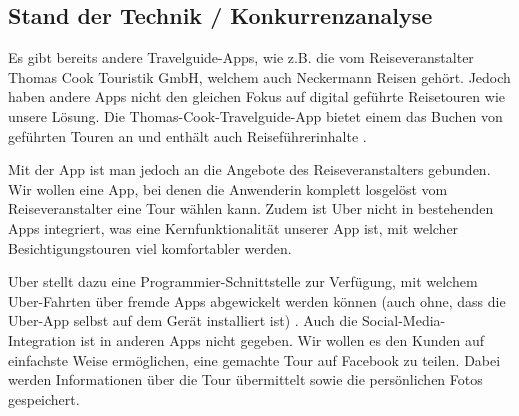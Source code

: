 \subsection{Stand der Technik / Konkurrenzanalyse}\label{StandTechnik}
Es gibt bereits andere Travelguide-Apps, wie z.B. die vom Reiseveranstalter Thomas Cook Touristik GmbH, welchem auch Neckermann Reisen gehört. Jedoch haben andere Apps nicht den gleichen Fokus auf digital geführte Reisetouren wie unsere Lösung. Die Thomas-Cook-Travelguide-App bietet einem das Buchen von geführten Touren an und enthält auch Reiseführerinhalte \cite{TomasCookApp}.

Mit der App ist man jedoch an die Angebote des Reiseveranstalters gebunden. Wir wollen eine App, bei denen die Anwenderin komplett losgelöst vom Reiseveranstalter eine Tour wählen kann. Zudem ist Uber nicht in bestehenden Apps integriert, was eine Kernfunktionalität unserer App ist, mit welcher Besichtigungstouren viel komfortabler werden.

Uber stellt dazu eine Programmier-Schnittstelle zur Verfügung, mit welchem Uber-Fahrten über fremde Apps abgewickelt werden können (auch ohne, dass die Uber-App selbst auf dem Gerät installiert ist) \cite{UberApi}. Auch die Social-Media-Integration ist in anderen Apps nicht gegeben. Wir wollen es den Kunden auf einfachste Weise ermöglichen, eine gemachte Tour auf Facebook zu teilen. Dabei werden Informationen über die Tour übermittelt sowie die persönlichen Fotos gespeichert.

